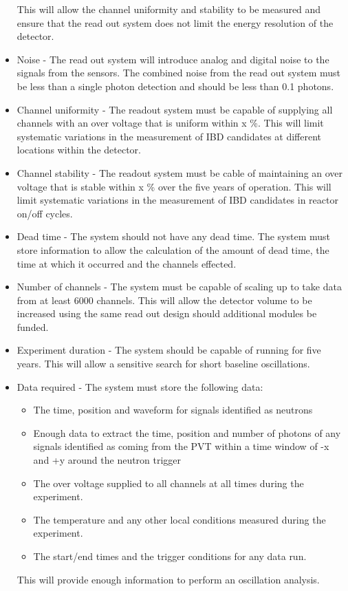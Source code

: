 \documentclass[a4paper]{article}
\begin{document}
\begin{itemize}
    This will allow the channel uniformity and stability to be measured and ensure that the read out system does not limit the energy resolution of the detector.
\item Noise - The read out system will introduce analog and digital noise to the signals from the sensors. 
    The combined noise from the read out system must be less than a single photon detection and should be less than 0.1 photons.
\item Channel uniformity - The readout system must be capable of supplying all channels with an over voltage that is uniform within x \%. 
    This will limit systematic variations in the measurement of IBD candidates at different locations within the detector.
\item Channel stability - The readout system must be cable of maintaining an over voltage that is stable within x \% over the five years of operation. 
    This will limit systematic variations in the measurement of IBD candidates in reactor on/off cycles.
\item Dead time - The system should not have any dead time. The system must store information to allow the calculation of the amount of dead time, the time at which it occurred and the channels effected.
\item Number of channels - The system must be capable of scaling up to take data from at least 6000 channels. 
    This will allow the detector volume to be increased using the same read out design should additional modules be funded.  
\item Experiment duration - The system should be capable of running for five years. 
    This will allow a sensitive search for short baseline oscillations.
\item Data required - The system must store the following data: 
    \begin{itemize}
    \item The time, position and waveform for signals identified as neutrons
    \item Enough data to extract the time, position and number of photons of any signals identified as coming from the PVT within a time window of -x and +y around the neutron trigger
    \item The over voltage supplied to all channels at all times during the experiment.
    \item The temperature and any other local conditions measured during the experiment.
    \item The start/end times and the trigger conditions for any data run.   
    \end{itemize}
    This will provide enough information to perform an oscillation analysis.
\end{itemize}
\end{document}
